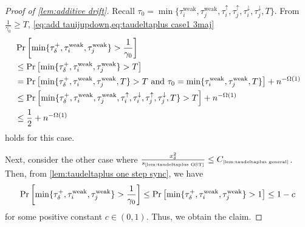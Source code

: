 \documentclass[letterpaper,11pt]{article}
\newcommand{\constref}[1]{C_{\mbox{\tiny\ref{#1}}}}
\newcommand{\constrefs}[2]{C_{\mbox{\tiny\ref{#1}(\ref{#2})}}}
\newcommand{\varianceref}[1]{\variance_{\mbox{\tiny\ref{#1}}}}
\newcommand{\alphanorm}{\gamma}
\newcommand{\taudeltaplus}{\tau^{+}_\delta}
\newcommand{\variance}{s}
\newcommand{\tauiup}{\tau^{\uparrow}_i}
\newcommand{\tauidown}{\tau^{\downarrow}_i}
\newcommand{\tauiweak}{\tau^{\mathrm{weak}}_i}
\newcommand{\taujweak}{\tau^{\mathrm{weak}}_j}
\newcommand{\taujup}{\tau^{\uparrow}_j}
\newcommand{\taujdown}{\tau^{\downarrow}_j}
\newcommand{\xdelta}{x_{\delta}}
\begin{document}
\begin{proof}[Proof of \cref{lem:additive drift}]
    Recall $\tau_0=\min\{\tauiweak,\taujweak,\tauiup,\taujup,\tauidown,\taujdown,T\}$.
    From $\frac{1}{\alphanorm_0}\geq T$, \cref{eq:add tauijupdown,eq:taudeltaplus case1 3maj}
    \begin{align*}
      &\Pr\qty[\min\{\taudeltaplus,\tauiweak,\taujweak\}>\frac{1}{\alphanorm_0}] \\
      &\leq \Pr\qty[\min\{\taudeltaplus,\tauiweak,\taujweak\}>T]\\
      &=\Pr\qty[\min\{\taudeltaplus,\tauiweak,\taujweak,T\}>T\textrm{ and }\tau_0=\min\{\tauiweak,\taujweak,T\}]+n^{-\Omega(1)}\\
      &\leq \Pr\qty[\min\{\taudeltaplus,\tauiweak,\taujweak,\tauiup,\tauidown,\taujup,\taujdown,T\}>T]+n^{-\Omega(1)}\\
      &\leq \frac{1}{2}+n^{-\Omega(1)}
    \end{align*}
    holds for this case.
    

Next, consider the other case where $\frac{\xdelta^2}{\varianceref{lem:taudeltaplus OST}}\leq \constref{lem:taudeltaplus general}$.
  Then, from \cref{lem:taudeltaplus one step sync}, we have
  \begin{align*}
    \Pr\qty[\min\{\taudeltaplus,\tauiweak,\taujweak\}>\frac{1}{\alphanorm_0}]
    \leq \Pr\qty[\min\{\taudeltaplus,\tauiweak,\taujweak\}>1]\leq 1-c
  \end{align*}
  for some positive constant $c\in (0,1)$.
  Thus, we obtain the claim.


\end{proof}
\end{document}
